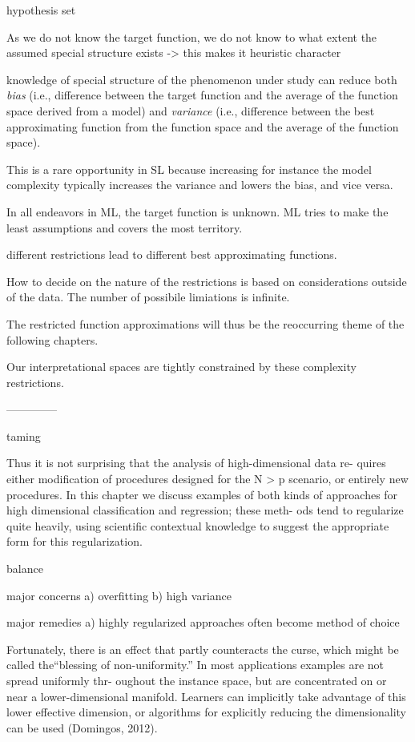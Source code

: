 \documentclass[authoryear,review,3p]{elsarticle}
\begin{document}
hypothesis set



As we do not know the target function,
we do not know to what extent the assumed special structure exists
-> this makes it heuristic character


knowledge of special structure of the phenomenon under study
can reduce both \textit{bias}
(i.e., difference between the target function and
the average of the function space derived from a model)
and
\textit{variance}
(i.e., difference between the best approximating function 
from the function space and
the average of the function space).

This is a rare opportunity in SL because increasing
for instance the model complexity
typically increases the variance and lowers the bias, and vice versa.


In all endeavors in ML, the target function is unknown. 
ML tries to make the least assumptions and covers the most territory.

different restrictions lead to different
best approximating functions.

How to decide on the nature of the restrictions is based on considerations outside of the data.
The number of possibile limiations is infinite.

The restricted function approximations
will thus be the reoccurring theme of the following chapters.


Our interpretational spaces are tightly constrained by these
complexity restrictions.

--------------

taming 

Thus it is not surprising that the analysis of high-dimensional data re- quires either modification of procedures designed for the N > p scenario, or entirely new procedures. In this chapter we discuss examples of both kinds of approaches for high dimensional classification and regression; these meth- ods tend to regularize quite heavily, using scientific contextual knowledge to suggest the appropriate form for this regularization.

balance

major concerns
a) overfitting
b) high variance

major remedies
a) highly regularized approaches often become method of choice


Fortunately, there is an effect that partly counteracts the curse, which might be called the“blessing of non-uniformity.” In most applications examples are not spread uniformly thr- oughout the instance space, but are concentrated on or near a lower-dimensional manifold. Learners can implicitly take advantage of this lower effective dimension, or algorithms for explicitly reducing the dimensionality can be used
(Domingos, 2012).
\end{document}
